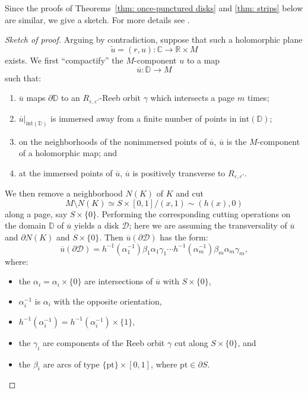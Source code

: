 \documentclass[JEP,XML,SOM,Unicode,NoFloatCountersInSection]{cedram}
\let\mathcal\mathscr
\newcommand{\inte}{\mathrm{int}}
\theoremstyle{plain}
\theoremstyle{definition}
\numberwithin{equation}{subsection}
\newcommand{\CC}{\mathbb{C}}
\newcommand{\RR}{\mathbb{R}}
\newcommand{\bdry}{\partial}
\begin{document}
Since the proofs of Theorems~\ref{thm: once-punctured disks} and \ref{thm: strips} below are similar, we give a sketch. For more details see \cite[\S 8]{CH2}.

\begin{proof}[Sketch of proof]
Arguing by contradiction, suppose that such a holomorphic plane
$$\widetilde u=(r,u): \CC\to \RR\times M$$
exists. We first ``compactify'' the $M$-component $u$ to a map
$$\overline{u}: \mathbb{D}\to M$$
such that:
\begin{enumerate}\renewcommand{\theenumi}{C\arabic{enumi}}
\item\label{enum:C1}
$\overline{u}$ maps $\bdry \mathbb{D}$ to an $R_{\varepsilon,\varepsilon'}$-Reeb orbit $\gamma$ which intersects a page $m$ times;
\item\label{enum:C2}
$\overline{u}|_{\inte(\mathbb{D})}$ is immersed away from a finite number of points in $\inte(\mathbb{D})$;
\item\label{enum:C3}
on the neighborhoods of the nonimmersed points of $\overline{u}$, $\overline{u}$ is the $M$-component of a holomorphic map; and
\item\label{enum:C4}
at the immersed points of $\overline{u}$, $\overline{u}$ is positively transverse to $R_{\varepsilon,\varepsilon'}$.
\end{enumerate}

We then remove a neighborhood $N(K)$ of $K$ and cut
$$M\setminus N(K)\simeq S\times[0,1]/(x,1)\sim (h(x),0)$$
along a page, say $S\times\{0\}$. Performing the corresponding cutting operations on the domain $\mathbb{D}$ of $\overline{u}$ yields a disk $\mathcal{D}$; here we are assuming the transversality of $\overline{u}$ and $\bdry N(K)$ and $S\times\{0\}$. Then $\overline{u}(\bdry \mathcal{D})$ has the form:
\begin{equation}
\overline{u}(\bdry \mathcal{D})=h^{-1}(\alpha_1^{-1})\beta_1\alpha_1\gamma_1\cdots
h^{-1}(\alpha_m^{-1})\beta_m\alpha_m\gamma_m,
\end{equation}
where:
\begin{itemize}
\item the $\alpha_i=\alpha_i\times\{0\}$ are intersections of $\overline{u}$ with $S\times\{0\}$,
\item $\alpha_i^{-1}$ is $\alpha_i$ with the opposite orientation,
\item $h^{-1}(\alpha_i^{-1})=h^{-1}(\alpha_i^{-1})\times\{1\}$,
\item the $\gamma_i$ are components of the Reeb orbit $\gamma$ cut along $S\times\{0\}$, and
\item the $\beta_i$ are arcs of type $\{\mathrm{pt}\}\times [0,1]$, where $\mathrm{pt}\in \bdry S$.
\end{itemize}


\end{proof}
\end{document}

